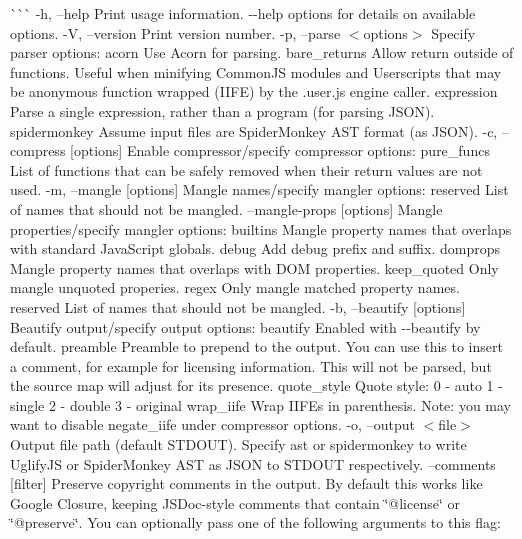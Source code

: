\`{}\`{}\`{} -\/h, --help Print usage information. {\ttfamily -\/-\/help options} for details on available options. -\/V, --version Print version number. -\/p, --parse $<$options$>$ Specify parser options\+: {\ttfamily acorn} Use Acorn for parsing. {\ttfamily bare\+\_\+returns} Allow return outside of functions. Useful when minifying Common\+JS modules and Userscripts that may be anonymous function wrapped (I\+I\+FE) by the .user.\+js engine {\ttfamily caller}. {\ttfamily expression} Parse a single expression, rather than a program (for parsing J\+S\+ON). {\ttfamily spidermonkey} Assume input files are Spider\+Monkey A\+ST format (as J\+S\+ON). -\/c, --compress \mbox{[}options\mbox{]} Enable compressor/specify compressor options\+: {\ttfamily pure\+\_\+funcs} List of functions that can be safely removed when their return values are not used. -\/m, --mangle \mbox{[}options\mbox{]} Mangle names/specify mangler options\+: {\ttfamily reserved} List of names that should not be mangled. --mangle-\/props \mbox{[}options\mbox{]} Mangle properties/specify mangler options\+: {\ttfamily builtins} Mangle property names that overlaps with standard Java\+Script globals. {\ttfamily debug} Add debug prefix and suffix. {\ttfamily domprops} Mangle property names that overlaps with D\+OM properties. {\ttfamily keep\+\_\+quoted} Only mangle unquoted properies. {\ttfamily regex} Only mangle matched property names. {\ttfamily reserved} List of names that should not be mangled. -\/b, --beautify \mbox{[}options\mbox{]} Beautify output/specify output options\+: {\ttfamily beautify} Enabled with {\ttfamily -\/-\/beautify} by default. {\ttfamily preamble} Preamble to prepend to the output. You can use this to insert a comment, for example for licensing information. This will not be parsed, but the source map will adjust for its presence. {\ttfamily quote\+\_\+style} Quote style\+: 0 -\/ auto 1 -\/ single 2 -\/ double 3 -\/ original {\ttfamily wrap\+\_\+iife} Wrap I\+I\+F\+Es in parenthesis. Note\+: you may want to disable {\ttfamily negate\+\_\+iife} under compressor options. -\/o, --output $<$file$>$ Output file path (default S\+T\+D\+O\+UT). Specify {\ttfamily ast} or {\ttfamily spidermonkey} to write Uglify\+JS or Spider\+Monkey A\+ST as J\+S\+ON to S\+T\+D\+O\+UT respectively. --comments \mbox{[}filter\mbox{]} Preserve copyright comments in the output. By default this works like Google Closure, keeping J\+S\+Doc-\/style comments that contain \char`\"{}@license\char`\"{} or \char`\"{}@preserve\char`\"{}. You can optionally pass one of the following arguments to this flag\+:
